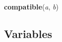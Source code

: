     \vspace{0.5ex}

\hspace{.8\funcindent}\begin{boxedminipage}{\funcwidth}

    \raggedright \textbf{compatible}(\textit{a}, \textit{b})

\setlength{\parskip}{2ex}
\setlength{\parskip}{1ex}
    \end{boxedminipage}



  \subsection{Variables}

